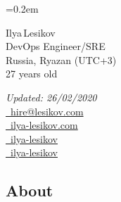\documentclass[11pt, a4paper]{article}
\newcommand{\Delimitline}{
  \vspace{-2ex}
  \noindent\makebox[\linewidth]{\rule{\DelimitlineLength}{0.12ex}} }
\begin{document}
\sffamily

\font=0.2em

\newlength{\DelimitlineLength}
\setlength{\DelimitlineLength}{\textwidth+1em}

\pagecolor[RGB]{245,245,245}


{\setlength\multicolsep{0pt}\begin{multicols}{2}
    \begin{spacing}{1.6}\raggedright\rmfamily
    {\huge \vphantom{Name: }Ilya\,Lesikov}\\[1.8ex]
    {\Large \vphantom{Title: }DevOps Engineer/SRE}\\
    {\Large \vphantom{Location: }Russia, Ryazan (UTC+3)}\\
    {\Large \vphantom{Age: }27 years old}
  \end{spacing}

  \columnbreak

  \begin{flushright}\begin{spacing}{1.3}\rmfamily
    \textit{Updated: 26/02/2020}\\[0.5ex]
    \large{
      \vphantom{contacts, contact information: }
      \faEnvelope \href{mailto:hire@lesikov.com}{\vphantom{Email: }\ hire@lesikov.com}\\
      \faInternetExplorer \href{https://ilya-lesikov.com}{\vphantom{Website: }\ ilya-lesikov.com}\\
      \faLinkedin \href{https://www.linkedin.com/in/ilya-lesikov}{\vphantom{LinkedIn: }\ ilya-lesikov}\\
      \faGithubAlt \href{https://github.com/ilya-lesikov}{\vphantom{GitHub: }\ ilya-lesikov}}
  \end{spacing}\end{flushright}
\end{multicols}}

\vspace{2ex}


\subsection*{About\vphantom{ (professional summary)}}
\Delimitline
\end{document}
